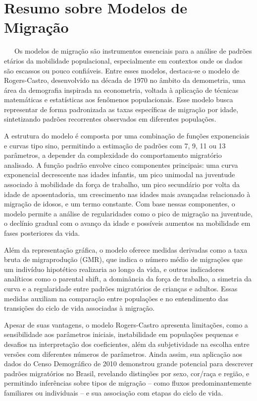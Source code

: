 \documentclass[
  12pt,
  a4paper,
]{scrreprt}
\begin{document}
\section{Resumo sobre Modelos de
Migração}\label{resumo-sobre-modelos-de-migrauxe7uxe3o}

~~~Os modelos de migração são instrumentos essenciais para a análise de
padrões etários da mobilidade populacional, especialmente em contextos
onde os dados são escassos ou pouco confiáveis. Entre esses modelos,
destaca-se o modelo de Rogers-Castro, desenvolvido na década de 1970 no
âmbito da demometria, uma área da demografia inspirada na econometria,
voltada à aplicação de técnicas matemáticas e estatísticas aos fenômenos
populacionais. Esse modelo busca representar de forma padronizada as
taxas específicas de migração por idade, sintetizando padrões
recorrentes observados em diferentes populações.

\vspace{12pt}

A estrutura do modelo é composta por uma combinação de funções
exponenciais e curvas tipo sino, permitindo a estimação de padrões com
7, 9, 11 ou 13 parâmetros, a depender da complexidade do comportamento
migratório analisado. A função padrão envolve cinco componentes
principais: uma curva exponencial decrescente nas idades infantis, um
pico unimodal na juventude associado à mobilidade da força de trabalho,
um pico secundário por volta da idade de aposentadoria, um crescimento
nas idades mais avançadas relacionado à migração de idosos, e um termo
constante. Com base nessas componentes, o modelo permite a análise de
regularidades como o pico de migração na juventude, o declínio gradual
com o avanço da idade e possíveis aumentos na mobilidade em fases
posteriores da vida.

\vspace{12pt}

Além da representação gráfica, o modelo oferece medidas derivadas como a
taxa bruta de migraprodução (GMR), que indica o número médio de
migrações que um indivíduo hipotético realizaria ao longo da vida, e
outros indicadores analíticos como o parental shift, a dominância da
força de trabalho, a simetria da curva e a regularidade entre padrões
migratórios de crianças e adultos. Essas medidas auxiliam na comparação
entre populações e no entendimento das transições do ciclo de vida
associadas à migração.

\vspace{12pt}

Apesar de suas vantagens, o modelo Rogers-Castro apresenta limitações,
como a sensibilidade aos parâmetros iniciais, instabilidade em
populações pequenas e desafios na interpretação dos coeficientes, além
da subjetividade na escolha entre versões com diferentes números de
parâmetros. Ainda assim, sua aplicação aos dados do Censo Demográfico de
2010 demonstrou grande potencial para descrever padrões migratórios no
Brasil, revelando distinções por sexo, cor/raça e região, e permitindo
inferências sobre tipos de migração -- como fluxos predominantemente
familiares ou individuais -- e sua associação com etapas do ciclo de
vida.
\end{document}
